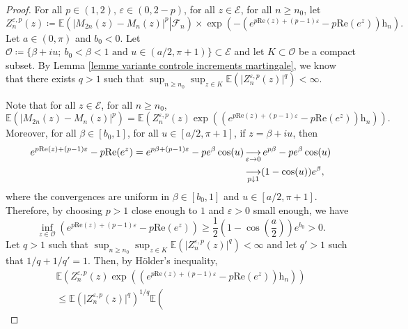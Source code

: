 \documentclass[11pt]{article}
\numberwithin{equation}{section}
\def\vp{\varepsilon}
\def\E{\mathbb{E}}
\renewcommand{\Re}{\mathrm{Re}}
\begin{document}
\begin{proof}
	For all $p \in (1,2)$, $\vp \in (0, 2-p)$, for all $z\in \mathcal{E}$, for all $n\ge n_0$, let
	\[
	Z^{\vp, p}_n(z) \coloneqq
	 \E\left( \left. \left\vert M_{2n}(z)- M_n(z)\right\vert^p \right\vert \mathcal{F}_n\right) \times \exp\left( -\left(e^{p \Re(z) +(p-1)\vp}-p\Re(e^z)\right) \mathrm{h}_n \right) .
	\]
	Let $a \in (0, \pi)$ and $b_0<0$. Let $\mathcal{O} \coloneqq \{ \beta+ i u; \ b_0< \beta <1 \text{ and } u \in (a/2, \pi+1)\} \subset \mathcal{E}$ and let $K \subset \mathcal{O}$ be a compact subset. By Lemma \ref{lemme variante controle increments martingale}, we know that there exists $q>1$ such that $\sup_{n\ge n_0} \sup_{z \in K}\E(\vert Z^{\vp, p}_n(z) \vert^q)<\infty$. 
	
	
	Note that for all $z \in \mathcal{E}$, for all $n\ge n_0$,
	\begin{equation}\label{eq M 2n moins M n egal Z}
	\E\left( \left\vert M_{2n}(z)- M_n(z)\right\vert^p \right) =\E\left(Z^{\vp, p}_n(z)  \exp\left( \left(e^{p \Re(z) +(p-1)\vp}-p\Re(e^z)\right) \mathrm{h}_n \right) \right).
	\end{equation}
	Moreover, for all $\beta\in [b_0, 1]$, for all $u \in [a/2, \pi+1]$, if $z= \beta+ iu$, then
	\begin{align}
		e^{p \Re(z) +(p-1)\vp}-p\Re(e^z) =  e^{p \beta + (p-1) \vp}  - p e^\beta \cos(u)
		&\mathop{\longrightarrow}\limits_{\vp \to 0}  e^{p \beta} - pe^\beta \cos(u)\notag
		\\
		&\mathop{\longrightarrow}\limits_{p \downarrow 1}  (1- \cos(u)) e^\beta, \label{eq limite p et epsilon vers zero}
	\end{align}
	where the convergences are uniform in $\beta\in [b_0, 1]$ and $u \in [a/2, \pi+1]$. Therefore, by choosing $p>1$ close enough to $1$ and $\vp>0$ small enough, we have
	\begin{equation}\label{eq minimum strictement positif}
	\inf_{z \in \mathcal{O}} \left( e^{p \Re(z) +(p-1)\vp}-p\Re(e^z) \right) \ge \frac{1}{2}\left(1- \cos\left(\frac{a}{2}\right)\right) e^{b_0}>0.
	\end{equation}
	Let $q>1$ such that $\sup_{n\ge n_0} \sup_{z \in K}\E(\vert Z^{\vp, p}_n(z) \vert^q)<\infty$ and let $q'>1$ such that $1/q+1/q'=1$. Then, by Hölder's inequality,
	\begin{multline}\label{eq Holder Z}
		\E\left(Z^{\vp, p}_n(z)  \exp\left( \left(e^{p \Re(z) +(p-1)\vp}-p\Re(e^z)\right) \mathrm{h}_n \right) \right)\\\le \E(\vert Z^{\vp, p}_n(z)   \vert^q)^{1/q}  \E\left(

\end{multline}
\end{proof}
\end{document}
